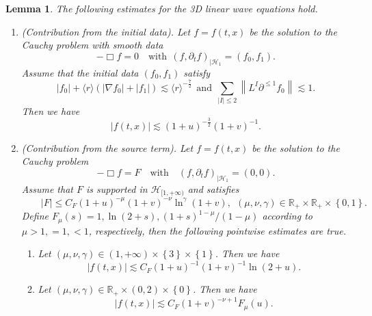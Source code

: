 \documentclass[10pt,a4paper]{amsart}
\newtheorem{lemma}{Lemma}
\def \R {{\mathbb{R} }}
\def \pt{\partial_{t}}
\begin{document}
 \begin{lemma}\label{le:Linfty}
 The following estimates for the 3D linear wave equations hold.
 \begin{enumerate}
     \item \emph{({Contribution from the initial data}).}
     Let $f=f(t,x)$ be the solution to the Cauchy problem with smooth data
  \begin{equation}\label{equ:waveinitial}
     -\Box f=0\quad \mbox{with}\ \ (f,\pt f)_{|\mathcal{H}_{1}}=(f_{0},f_{1}).
 \end{equation}
Assume that the initial data $(f_{0},f_{1})$ satisfy
\begin{equation}\label{est:smallinitial}
    |f_{0}|+\langle r\rangle\left(|\nabla f_{0}|+|f_{1}|\right)\lesssim {}\langle  r\rangle^{-\frac{7}{2}} \ \ \mbox{and}\ \ 
    \sum_{|I|\le 2}\left\|L^{I}\partial^{\leq 1} f_0\right\|\lesssim 1.
\end{equation}
 Then we have 
 \begin{equation*}
     |f(t,x)|\lesssim (1+u)^{-\frac{3}{2}}(1+v)^{-1}.
 \end{equation*}

\item \emph{({Contribution from the source term}).}
Let $f=f(t,x)$ be the solution to the Cauchy problem
	\begin{equation}\label{equ:wavesource}
	-\Box f=F\quad \mbox{with}\quad (f,\pt f)_{|\mathcal{H}_{1}}=(0,0).
    \end{equation}
	Assume that $F$ is supported in $\mathcal{H}_{[1,+\infty)}$ and satisfies
	\begin{equation*}
	\qquad |F|\le C_{F} (1+u)^{-\mu}(1+v)^{-\nu} \ln^{\gamma} (1+v),\ \  (\mu, \nu, \gamma)\in \mathbb{R}_{+}\times \mathbb{R}_+\times \left\{0,1\right\}.
	\end{equation*}
	Define $F_{\mu}(s)=1,\ln (2+s), (1+s)^{1-\mu}/(1-\mu)$ according to $\mu >1,=1,<1$, respectively, then the following pointwise estimates are true.
	\begin{enumerate}

     \item [\emph{(a)}]  Let $(\mu,\nu,\gamma)\in (1,+\infty)\times \left\{3\right\}\times \left\{1\right\}$. Then we have 
		\begin{equation*}
		|f(t,x)|\lesssim C_{F}(1+u)^{-1}(1+v)^{-1}\ln (2+u).
		\end{equation*}
		
		\item [\emph{(b)}]
        Let $(\mu,\nu,\gamma)\in \R_{+}\times (0,2)\times\left\{0\right\}$.
        Then we have 
		\begin{equation*}
		|f(t,x)|\lesssim C_{F}(1+v)^{-\nu+1}F_{\mu}(u).
		\end{equation*}
		

\end{enumerate}
\end{enumerate}
\end{lemma}
\end{document}
